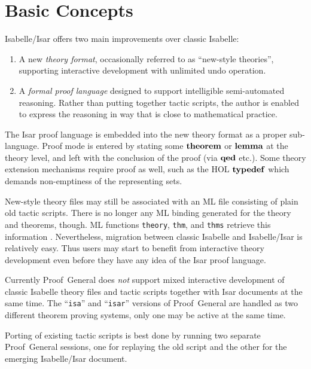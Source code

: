 
\chapter{Basic Concepts}\label{ch:basics}

Isabelle/Isar offers two main improvements over classic Isabelle:
\begin{enumerate}
\item A new \emph{theory format}, occasionally referred to as ``new-style
  theories'', supporting interactive development with unlimited undo
  operation.
\item A \emph{formal proof language} designed to support intelligible
  semi-automated reasoning.  Rather than putting together tactic scripts, the
  author is enabled to express the reasoning in way that is close to
  mathematical practice.
\end{enumerate}

The Isar proof language is embedded into the new theory format as a proper
sub-language.  Proof mode is entered by stating some ${\mathord{\mathbf{theorem}}}$ or
${\mathord{\mathbf{lemma}}}$ at the theory level, and left with the conclusion of the proof
(via ${\mathord{\mathbf{qed}}}$ etc.).  Some theory extension mechanisms require proof as
well, such as the HOL ${\mathord{\mathbf{typedef}}}$ which demands non-emptiness of
the representing sets.

New-style theory files may still be associated with an ML file consisting of
plain old tactic scripts.  There is no longer any ML binding generated for the
theory and theorems, though.  ML functions \texttt{theory}, \texttt{thm}, and
\texttt{thms} retrieve this information \cite{isabelle-ref}.  Nevertheless,
migration between classic Isabelle and Isabelle/Isar is relatively easy.  Thus
users may start to benefit from interactive theory development even before
they have any idea of the Isar proof language.

\begin{warn}
  Currently Proof~General does \emph{not} support mixed interactive
  development of classic Isabelle theory files and tactic scripts together
  with Isar documents at the same time.  The ``\texttt{isa}'' and
  ``\texttt{isar}'' versions of Proof~General are handled as two different
  theorem proving systems, only one may be active at the same time.
\end{warn}

Porting of existing tactic scripts is best done by running two separate
Proof~General sessions, one for replaying the old script and the other for the
emerging Isabelle/Isar document.


